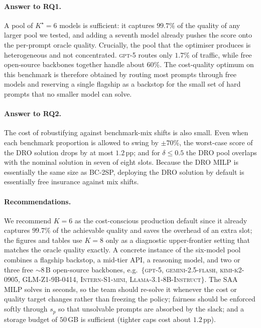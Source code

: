 \documentclass[11pt]{article}
\begin{document}
\paragraph{Answer to RQ1.}
A pool of $K^{\star}=6$ models is sufficient: it captures $99.7\%$ of the
quality of any larger pool we tested, and adding a seventh model already
pushes the score onto the per-prompt oracle quality. Crucially, the pool that the
optimiser produces is heterogeneous and not concentrated. \textsc{gpt-5}
routes only $1.7\%$ of traffic, while free open-source backbones together
handle about $60\%$. The cost-quality optimum on this benchmark is
therefore obtained by routing most prompts through free models and
reserving a single flagship as a backstop for the small set of hard
prompts that no smaller model can solve.

\paragraph{Answer to RQ2.}
The cost of robustifying against benchmark-mix shifts is also small. Even
when each benchmark proportion is allowed to swing by $\pm 70\%$, the
worst-case score of the DRO solution drops by at most $1.2$\,pp; and for
$\delta\le 0.5$ the DRO pool overlaps with the nominal solution in seven
of eight slots. Because the DRO MILP is essentially the same size as
BC-2SP, deploying the DRO solution by default is essentially free
insurance against mix shifts.

\paragraph{Recommendations.}
We recommend $K=6$ as the cost-conscious production default since it
already captures $99.7\%$ of the achievable quality and saves the overhead
of an extra slot; the figures and tables use $K=8$ only as a diagnostic
upper-frontier setting that matches the oracle quality exactly. A concrete
instance of the six-model pool combines a flagship backstop, a mid-tier
API, a reasoning model, and two or three free $\sim\!8$\,B open-source
backbones, e.g.\ $\{$\textsc{gpt-5}, \textsc{gemini-2.5-flash},
\textsc{kimi-k2-0905}, \textsc{GLM-Z1-9B-0414}, \textsc{Intern-S1-mini},
\textsc{Llama-3.1-8B-Instruct}$\}$. The SAA MILP solves in seconds, so the
team should re-solve it whenever the cost or quality target changes rather
than freezing the policy; fairness should be enforced softly through
$s_p$ so that unsolvable prompts are absorbed by the slack; and a storage
budget of $50$\,GB is sufficient (tighter caps cost about $1.2$\,pp).
\end{document}
